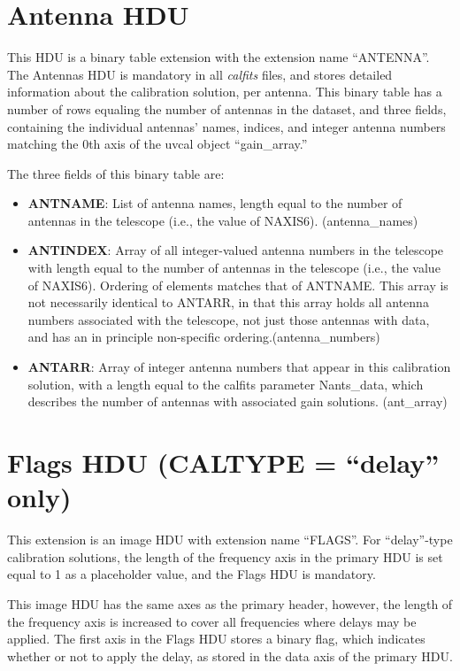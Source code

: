 \documentclass[11pt, oneside, english]{article}   	%
\begin{document}
\section{Antenna HDU}
This HDU is a binary table extension with the extension name ``ANTENNA''.
The Antennas HDU is mandatory in all \emph{calfits} files, and stores detailed information about the calibration solution, per antenna.
This binary table has a number of rows equaling the number of antennas in the dataset, and three fields, containing the individual antennas' names, indices, and integer antenna numbers matching the 0th axis of the uvcal object ``gain\_array.''

The three fields of this binary table are:
\begin{itemize}
\item{\textbf{ANTNAME}: List of antenna names, length equal to the number of antennas in the telescope (i.e., the value of NAXIS6). (antenna\_names)}
\item{\textbf{ANTINDEX}: Array of all integer-valued antenna numbers in the telescope with length equal to the number of antennas in the telescope (i.e., the value of NAXIS6). 
Ordering of elements matches that of ANTNAME. 
This array is not necessarily identical to ANTARR, in that this array holds all antenna numbers associated with the telescope, not just those antennas with data, and has an in principle non-specific ordering.(antenna\_numbers)}
\item{\textbf{ANTARR}: Array of integer antenna numbers that appear in this calibration solution, with a length equal to the calfits parameter Nants\_data, which describes the number of antennas with associated gain solutions. (ant\_array)}

\end{itemize}

\section{Flags HDU (CALTYPE = ``delay'' only)}
This extension is an image HDU with extension name ``FLAGS''.
For ``delay''-type calibration solutions, the length of the frequency axis in the primary HDU is set equal to 1 as a placeholder value, and the Flags HDU is mandatory.

This image HDU has the same axes as the primary header, however, the length of the frequency axis is increased to cover all frequencies where delays may be applied.
The first axis in the Flags HDU stores a binary flag, which indicates whether or not to apply the delay, as stored in the data axis of the primary HDU.
\end{document}
